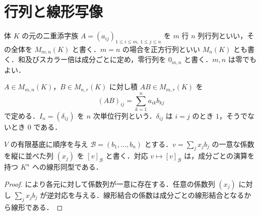 \section{行列と線形写像}
\begin{defn}[行列]
体 $K$ の元の二重添字族 $A=(a_{ij})_{1\leq i\leq m,\,1\leq j\leq n}$ を $m$ 行 $n$ 列行列といい，その全体を $M_{m,n}(K)$ と書く．$m=n$ の場合を正方行列といい $M_n(K)$ とも書く．和及びスカラー倍は成分ごとに定め，零行列を $0_{m,n}$ と書く．$m,n$ は零でもよい．
\end{defn}
\begin{defn}[行列の積と単位行列]
$A\in M_{m,n}(K)$，$B\in M_{n,r}(K)$ に対し積 $AB\in M_{m,r}(K)$ を
\[
 (AB)_{ij}=\sum_{k=1}^n a_{ik}b_{kj}
\]
で定める．$I_n=(\delta_{ij})$ を $n$ 次単位行列という．$\delta_{ij}$ は $i=j$ のとき $1$，そうでないとき $0$ である．
\end{defn}
\begin{prop}[基底による座標表示]
$V$ の有限基底に順序を与え $\mathcal B=(b_1,\ldots,b_n)$ とする．$v=\sum_j x_jb_j$ の一意な係数を縦に並べた列 $(x_j)$ を $[v]_{\mathcal B}$ と書く．対応 $v\mapsto[v]_{\mathcal B}$ は，成分ごとの演算を持つ $K^n$ への線形同型である．
\end{prop}
\begin{proof}
により各元に対して係数列が一意に存在する．任意の係数列 $(x_j)$ に対し $\sum_j x_jb_j$ が逆対応を与える．線形結合の係数は成分ごとの線形結合となるから線形である．
\end{proof}
